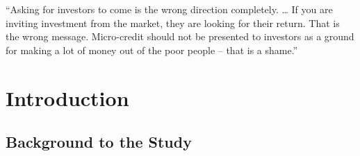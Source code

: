 \documentclass[a4paper,nobind]{templates/ociamthesis}
\begin{document}
\begin{romanpages}
\flushbottom

\tableofcontents

\listoffigures
	\mtcaddchapter

\listoftables
  \mtcaddchapter


\end{romanpages}

\flushbottom

\begin{savequote}
``Asking for investors to come is the wrong direction completely.
\ldots{} If you are inviting investment from the market, they are
looking for their return. That is the wrong message. Micro-credit should
not be presented to investors as a ground for making a lot of money out
of the poor people -- that is a shame.''
\end{savequote}



\hypertarget{rmd-basics}{%
\chapter{Introduction}\label{rmd-basics}}

\minitoc 

\hypertarget{background-to-the-study}{%
\section{Background to the Study}\label{background-to-the-study}}
\end{document}
